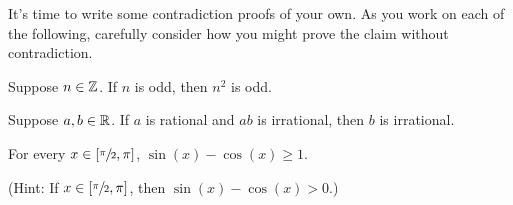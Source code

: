 \begin{question}[resume]
\item It's time to write some contradiction proofs of your own.  As you work on each of the following, carefully consider how you might prove the claim without contradiction.  

\begin{claim}  Suppose $n \in \mathbb{Z}$.  If $n$ is odd, then $n^2$ is odd.
\end{claim}

\newpage

\begin{claim}  Suppose $a,b \in \mathbb{R}$.  If $a$ is rational and $ab$ is irrational, then $b$ is irrational.
\end{claim}
\vspace{3in}
\begin{claim}  For every $x \in [\sfrac{\pi}{2},\pi]$, $\sin(x)-\cos(x) \geq 1$.
\end{claim}
(Hint: If $x \in [\sfrac{\pi}{2},\pi]$, then $\sin(x)-\cos(x)>0$.)

\end{question}





